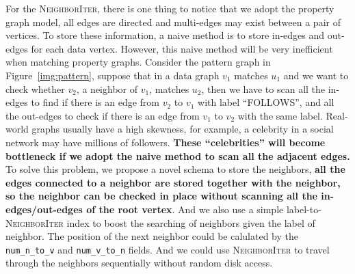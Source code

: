 For the \textsc{NeighborIter}, there is one thing to notice that we adopt the property graph model,
all edges are directed and multi-edges may exist between a pair of vertices.
To store these information, a naive method is to store in-edges and out-edges for each data vertex.
However, this naive method will be very inefficient when matching property graphs.
Consider the pattern graph in Figure~\ref{img:pattern},
suppose that in a data graph $v_1$ matches $u_1$ and we want to check whether $v_2$, a neighbor of $v_1$, matches $u_2$,
then we have to scan all the in-edges to find if there is an edge from $v_2$ to $v_1$ with label ``FOLLOWS'',
and all the out-edges to check if there is an edge from $v_1$ to $v_2$ with the same label.
Real-world graphs usually have a high skewness, for example, a celebrity in a social network may have millions of followers.
\textbf{These ``celebrities'' will become bottleneck if we adopt the naive method to scan all the adjacent edges.}
To solve this problem, we propose a novel schema to store the neighbors,
\textbf{all the edges connected to a neighbor are stored together with the neighbor,
so the neighbor can be checked in place without scanning all the in-edges/out-edges of the root vertex}.
And we also use a simple label-to-\textsc{NeighborIter} index to boost the searching of neighbors given the label of neighbor.
The position of the next neighbor could be calulated by the \texttt{num_n_to_v} and \texttt{num_v_to_n} fields.
And we could use \textsc{NeighborIter} to travel through the neighbors sequentially without random disk access.

